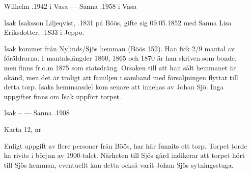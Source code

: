 Wilhelm .1942 i Vasa  ---  Sanna .1958 i Vasa


%
Isak Isaksson Liljeqvist, .1831 på Böös, gifte sig 09.05.1852 med Sanna Lisa Eriksdotter,  .1833 i Jeppo.
\begin{jhchildren}
  \item {}
  \item {}
  \item {}
  \item {}
  \item {}
  \item {}
  \item {}
  \item {}
  \item {}
  \item {}
\end{jhchildren}
Isak kommer från Nylinds/Sjös hemman (Böös 152). Han fick 2/9 mantal av föräldrarna. I mantalslängder 1860, 1865 och 1870 är han skriven som bonde, men finns fr.o.m 1875 som statsdräng. Orsaken till att han sålt hemmanet är okänd, men det är troligt att familjen i samband med försäljningen flyttat till detta torp. Isaks hemmansdel kom senare att innehas av Johan Sjö. Inga uppgifter finns om Isak uppfört torpet.

Isak --  ---  Sanna .1908


Karta 12,   nr 

Enligt uppgift av flere personer från Böös, har här funnits ett torp. Torpet torde ha rivits i början av 1900-talet. Närheten till Sjös gård indikerar att torpet hört till Sjös hemman, eventuellt kan detta också varit Johan Sjös sytningsstuga.


